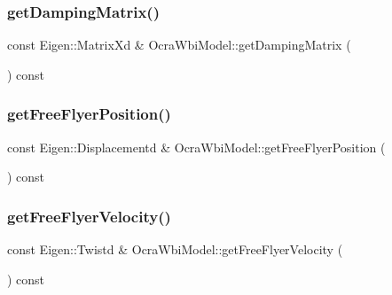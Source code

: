 \hypertarget{classocra__icub_1_1OcraWbiModel_abe5946b7948e22fedfd09575fd4edbf7}{}\label{classocra__icub_1_1OcraWbiModel_abe5946b7948e22fedfd09575fd4edbf7} 
\subsubsection{\texorpdfstring{get\+Damping\+Matrix()}{getDampingMatrix()}}
{\footnotesize\ttfamily const Eigen\+::\+Matrix\+Xd \& Ocra\+Wbi\+Model\+::get\+Damping\+Matrix (\begin{DoxyParamCaption}{ }\end{DoxyParamCaption}) const\hspace{0.3cm}{\ttfamily [virtual]}}

\hypertarget{classocra__icub_1_1OcraWbiModel_a1e48e56afb9ff2904785d5878d1021a9}{}\label{classocra__icub_1_1OcraWbiModel_a1e48e56afb9ff2904785d5878d1021a9} 
\subsubsection{\texorpdfstring{get\+Free\+Flyer\+Position()}{getFreeFlyerPosition()}}
{\footnotesize\ttfamily const Eigen\+::\+Displacementd \& Ocra\+Wbi\+Model\+::get\+Free\+Flyer\+Position (\begin{DoxyParamCaption}{ }\end{DoxyParamCaption}) const\hspace{0.3cm}{\ttfamily [virtual]}}

\hypertarget{classocra__icub_1_1OcraWbiModel_a6f87ccbf428eed32efb5424ec57eb3c3}{}\label{classocra__icub_1_1OcraWbiModel_a6f87ccbf428eed32efb5424ec57eb3c3} 
\subsubsection{\texorpdfstring{get\+Free\+Flyer\+Velocity()}{getFreeFlyerVelocity()}}
{\footnotesize\ttfamily const Eigen\+::\+Twistd \& Ocra\+Wbi\+Model\+::get\+Free\+Flyer\+Velocity (\begin{DoxyParamCaption}{ }\end{DoxyParamCaption}) const\hspace{0.3cm}{\ttfamily [virtual]}}

